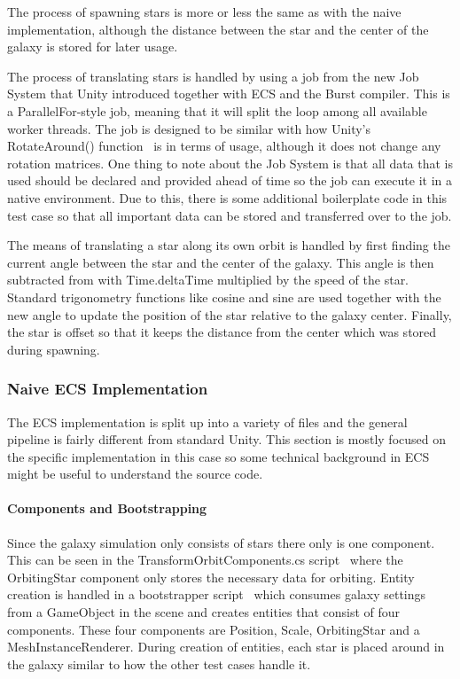 The process of spawning stars is more or less the same as with the naive implementation, although the distance between the star and the center of the galaxy is stored for later usage. 

The process of translating stars is handled by using a job from the new Job System that Unity introduced together with ECS and the Burst compiler. This is a ParallelFor-style job, meaning that it will split the loop among all available worker threads. The job is designed to be similar with how Unity's RotateAround() function~\cite{rotateAroundFunction} is in terms of usage, although it does not change any rotation matrices. One thing to note about the Job System is that all data that is used should be declared and provided ahead of time so the job can execute it in a native environment. Due to this, there is some additional boilerplate code in this test case so that all important data can be stored and transferred over to the job. 

The means of translating a star along its own orbit is handled by first finding the current angle between the star and the center of the galaxy. This angle is then subtracted from with Time.deltaTime multiplied by the speed of the star. Standard trigonometry functions like cosine and sine are used together with the new angle to update the position of the star relative to the galaxy center. Finally, the star is offset so that it keeps the distance from the center which was stored during spawning. 

\subsubsection{Naive ECS Implementation}
The ECS implementation is split up into a variety of files and the general pipeline is fairly different from standard Unity. This section is mostly focused on the specific implementation in this case so some technical background in ECS might be useful to understand the source code. 

\paragraph{Components and Bootstrapping}
Since the galaxy simulation only consists of stars there only is one component. This can be seen in the TransformOrbitComponents.cs script~\cite{transformOrbitComponent} where the OrbitingStar component only stores the necessary data for orbiting. Entity creation is handled in a bootstrapper script~\cite{bootstrapper} which consumes galaxy settings from a GameObject in the scene and creates entities that consist of four components. These four components are Position, Scale, OrbitingStar and a MeshInstanceRenderer. During creation of entities, each star is placed around in the galaxy similar to how the other test cases handle it. 

